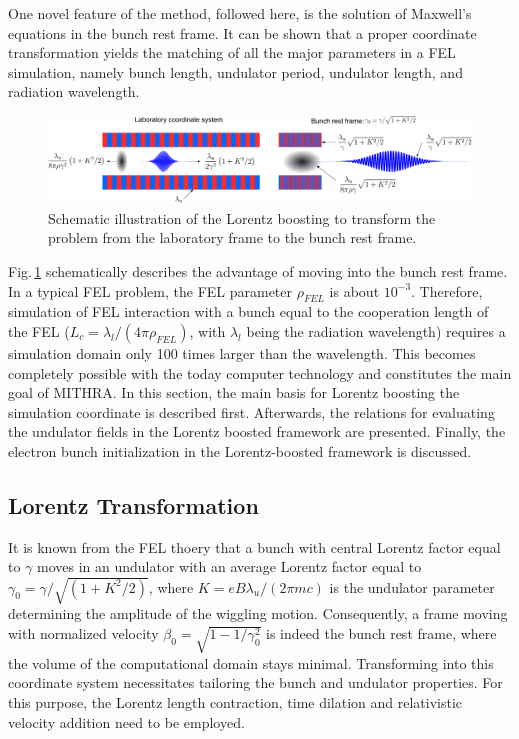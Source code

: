 One novel feature of the method, followed here, is the solution of Maxwell's equations in the bunch rest frame.
%
It can be shown that a proper coordinate transformation yields the matching of all the major parameters in a FEL simulation, namely bunch length, undulator period, undulator length, and radiation wavelength.
%
\begin{figure}
\centering
\includegraphics[width=7.0in]{./MITHRA_FDTDPIC/Fig2/Fig2.pdf}
\caption{Schematic illustration of the Lorentz boosting to transform the problem from the laboratory frame to the bunch rest frame.}
\label{FDTDPICFig2}
\end{figure}
%
Fig.\,\ref{FDTDPICFig2} schematically describes the advantage of moving into the bunch rest frame.
%
In a typical FEL problem, the FEL parameter $\rho_{FEL}$ is about $10^{-3}$.
%
Therefore, simulation of FEL interaction with a bunch equal to the cooperation length of the FEL ($L_c=\lambda_l/(4 \pi \rho_{FEL})$, with $\lambda_l$ being the radiation wavelength) requires a simulation domain only 100 times larger than the wavelength.
%
This becomes completely possible with the today computer technology and constitutes the main goal of MITHRA.
%
In this section, the main basis for Lorentz boosting the simulation coordinate is described first.
%
Afterwards, the relations for evaluating the undulator fields in the Lorentz boosted framework are presented.
%
Finally, the electron bunch initialization in the Lorentz-boosted framework is discussed.

\subsection{Lorentz Transformation}

It is known from the FEL thoery that a bunch with central Lorentz factor equal to $\gamma$ moves in an undulator with an average Lorentz factor equal to $\gamma_0=\gamma/\sqrt{(1+K^2/2)}$, where $K=eB\lambda_u/(2\pi m c)$ is the undulator parameter determining the amplitude of the wiggling motion.
%
Consequently, a frame moving with normalized velocity $\beta_0 = \sqrt{1-1/\gamma_0^2}$ is indeed the bunch rest frame, where the volume of the computational domain stays minimal.
%
Transforming into this coordinate system necessitates tailoring the bunch and undulator properties.
%
For this purpose, the Lorentz length contraction, time dilation and relativistic velocity addition need to be employed.

